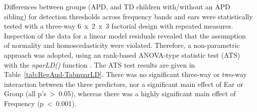 \documentclass[a4paper, twoside]{templates/ociamthesis}
\begin{document}
\begin{table}

\caption{\label{tab:RegAud-Tab1}Standard audiometry: Descriptives for pure-tone detection thresholds (dB HL) by frequency bands (kHz) and ear split by the two groups.}
\centering
{}
\end{table}

Differences between groups (APD, and TD children with/without an APD sibling) for detection thresholds across frequency bands and ears were statistically tested with a three-way 6~x~2~x~3 factorial design with repeated measures. Inspection of the data for a linear model residuals revealed that the assumption of normality and homoscedasticity were violated. Therefore, a non-parametric approach was adopted, using an rank-based ANOVA-type statistic test (ATS) with the \emph{nparLD()} function \autocite[nparLD package;][]{nparLDPackageR}. The ATS test results are given in Table~\ref{tab:RegAud-TabnparLD}. There was no significant three-way or two-way interaction between the three predictors, nor a significant main effect of Ear or Group (all p's~\textgreater~0.05), whereas there was a highly significant main effect of Frequency (p~\textless~0.001).\\
\end{document}

